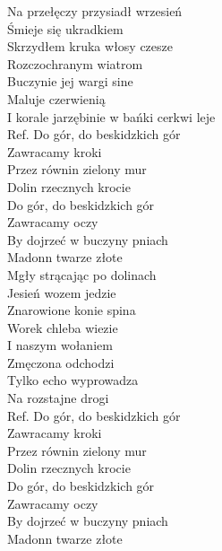 
Na przełęczy przysiadł wrzesień  \\
Śmieje się ukradkiem\tab{} \\
Skrzydłem kruka włosy czesze\tab{}  \\
Rozczochranym wiatrom \tab{} \\
Buczynie jej wargi sine\tab{} \\
Maluje czerwienią \tab{} \\
I korale jarzębinie w bańki cerkwi leje \\
\hops
Ref. Do gór, do beskidzkich gór \\
 Zawracamy kroki \tab{}\\
 Przez równin zielony mur \tab{} \\
 Dolin rzecznych krocie\tab{}  \\
 Do gór, do beskidzkich gór \\
 Zawracamy oczy \tab{}\\
 By dojrzeć w buczyny pniach  \\
 Madonn twarze złote\tab{}  \\
\hops
Mgły strącając po dolinach \\
Jesień wozem jedzie \\
Znarowione konie spina \\
Worek chleba wiezie \\
I naszym wołaniem \\
Zmęczona odchodzi \\
Tylko echo wyprowadza \\
Na rozstajne drogi  \\
\hops
Ref. Do gór, do beskidzkich gór\\
 Zawracamy kroki \\
 Przez równin zielony mur \\
 Dolin rzecznych krocie \\
 Do gór, do beskidzkich gór \\
 Zawracamy oczy \\
 By dojrzeć w buczyny pniach \\
 Madonn twarze złote